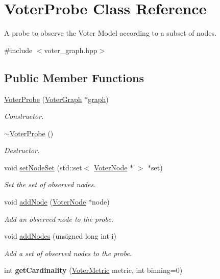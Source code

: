 \hypertarget{classVoterProbe}{\section{Voter\-Probe Class Reference}
\label{classVoterProbe}
}


A probe to observe the Voter Model according to a subset of nodes.  




{\ttfamily \#include $<$voter\-\_\-graph.\-hpp$>$}

\subsection*{Public Member Functions}
\begin{DoxyCompactItemize}
\item 
\hyperlink{classVoterProbe_a589eba6cb211385f334b2cad33c7b591}{Voter\-Probe} (\hyperlink{classVoterGraph}{Voter\-Graph} $\ast$\hyperlink{classVoterProbe_add099ac2ac20a5f6a0e3616e78639497}{graph})
\begin{DoxyCompactList}\small\item\em Constructor. \end{DoxyCompactList}\item 
\hypertarget{classVoterProbe_a13ddd0051f730aa8c5b4c1487ace3e16}{\hyperlink{classVoterProbe_a13ddd0051f730aa8c5b4c1487ace3e16}{$\sim$\-Voter\-Probe} ()}\label{classVoterProbe_a13ddd0051f730aa8c5b4c1487ace3e16}

\begin{DoxyCompactList}\small\item\em Destructor. \end{DoxyCompactList}\item 
void \hyperlink{classVoterProbe_a8d30841b343e791216084d6dd0f0f461}{set\-Node\-Set} (std\-::set$<$ \hyperlink{classVoterNode}{Voter\-Node} $\ast$ $>$ $\ast$set)
\begin{DoxyCompactList}\small\item\em Set the set of observed nodes. \end{DoxyCompactList}\item 
void \hyperlink{classVoterProbe_a102e61e3d43b00622f56e746b50aadcb}{add\-Node} (\hyperlink{classVoterNode}{Voter\-Node} $\ast$node)
\begin{DoxyCompactList}\small\item\em Add an observed node to the probe. \end{DoxyCompactList}\item 
void \hyperlink{classVoterProbe_a3833f42ffe18c150a127b2c98ff742fe}{add\-Nodes} (unsigned long int i)
\begin{DoxyCompactList}\small\item\em Add a set of observed nodes to the probe. \end{DoxyCompactList}\item 
\hypertarget{classVoterProbe_abea87d52f082036e8dd854d11bbc524b}{int {\bfseries get\-Cardinality} (\hyperlink{voter__graph_8hpp_acb4c45a5ce4a55eee28e54e60409b9c5}{Voter\-Metric} metric, int binning=0)}\label{classVoterProbe_abea87d52f082036e8dd854d11bbc524b}


\end{DoxyCompactItemize}
